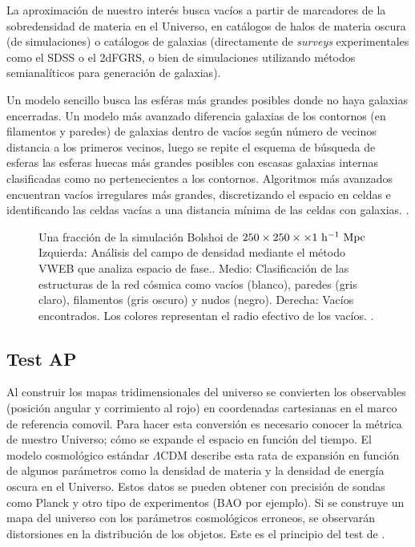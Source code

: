 \documentclass[preprint]{aastex62}
\begin{document}
  La aproximación de nuestro interés busca vacíos a partir de marcadores de la sobredensidad de materia
  en el Universo, en catálogos de halos de materia oscura (de simulaciones) o
  catálogos de galaxias (directamente de \textit{surveys} experimentales como el SDSS o el 2dFGRS, o bien
  de simulaciones utilizando métodos semianalíticos para generación de galaxias).

  Un modelo sencillo busca las esféras más grandes posibles  donde no haya galaxias encerradas.
  Un modelo más avanzado diferencia galaxias de los contornos (en filamentos y paredes)
  de galaxias dentro de vacíos según número de vecinos distancia a los primeros vecinos, luego se repite
  el esquema de búsqueda de esferas las esferas huecas más grandes posibles con escasas galaxias
  internas clasificadas como no pertenecientes a los contornos. Algoritmos más avanzados
  encuentran vacíos irregulares más grandes, discretizando el espacio en celdas e identificando las celdas
  vacías a una distancia mínima de las celdas con galaxias. \citep{Aspen-Amsterdam2008}.
  \begin{figure}
    \caption{Una fracción de la simulación Bolshoi \citep{Multidark2013} de $250 \times 250 \times \times 1 \rm ~h^{-1}~Mpc$
      Izquierda: Análisis del campo de densidad mediante el método VWEB que analiza espacio de fase..
      Medio: Clasificación de las estructuras de la red cósmica como vacíos (blanco),
      paredes (gris claro), filamentos (gris oscuro) y nudos (negro).
      Derecha: Vacíos encontrados. Los colores representan el radio efectivo de los vacíos.
      \citep{Fang2018}. \label{fig:voids_in_simulations}}
  \end{figure}
  \subsection{Test AP}
  Al construir los mapas tridimensionales del universo se convierten los observables (posición
  angular y corrimiento al rojo) en coordenadas cartesianas en el marco de referencia comovil.
  Para hacer esta conversión es necesario conocer la métrica de nuestro Universo; cómo se
  expande el espacio en función del tiempo. El modelo cosmológico estándar $\Lambda$CDM
  describe esta rata de expansión en función de algunos parámetros como la densidad de materia
  y la densidad de energía oscura en el Universo. Estos datos se pueden obtener con precisión
  de sondas como Planck y otro tipo de experimentos (BAO por ejemplo). Si se construye un mapa
  del universo con los parámetros cosmológicos erroneos, se observarán
  distorsiones en la distribución de los objetos. Este es el principio del test de
  \citet{AlcockPaczynski1979}.
\end{document}

